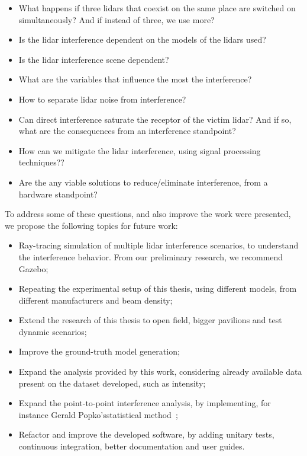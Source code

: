 \begin{itemize}
	\item What happens if three \acp{lidar} that coexist on the same place are switched on simultaneously? And if instead of three, we use more?
	\item Is the \ac{lidar} interference dependent on the models of the \acp{lidar} used?
	\item Is the \ac{lidar} interference scene dependent?
	\item What are the variables that influence the most the interference?
	\item How to separate \ac{lidar} noise from interference?
	\item Can direct interference saturate the receptor of the victim \ac{lidar}? And if so, what are the consequences from an interference standpoint?
	\item How can we mitigate the \ac{lidar} interference, using signal processing techniques??
	\item Are the any viable solutions to reduce/eliminate interference, from a hardware standpoint?
\end{itemize}

To address some of these questions, and also improve the work were presented, we propose the following topics for future work:

\begin{itemize}
	\item Ray-tracing simulation of multiple \ac{lidar} interference scenarios, to understand the interference behavior. From our preliminary research, we recommend Gazebo\cp;
	\item Repeating the experimental setup of this thesis, using different models, from different manufacturers and beam density;
	\item Extend the research of this thesis to open field, bigger pavilions and test dynamic scenarios;
	\item Improve the ground-truth model generation;
	\item Expand the analysis provided by this work, considering already available data present on the dataset developed, such as intensity;
	\item Expand the point-to-point interference analysis, by implementing, for instance Gerald Popko's\etal statistical method~\cite{Popko2019b};
	\item Refactor and improve the developed software, by adding unitary tests, continuous integration, better documentation and user guides.
\end{itemize}

